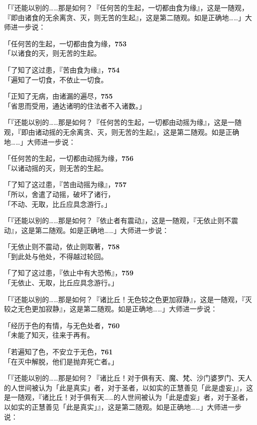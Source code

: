 「『还能以别的……那是如何？『任何苦的生起，一切都由食为缘』，这是一随观，『即由诸食的无余离贪、灭，则无苦的生起』，这是第二随观。如是正确地……」大师进一步说：


「任何苦的生起，一切都由食为缘，\hfill{\grayfootnotesize \textbf{753}} \\
「以诸食的灭，则无苦的生起。

「了知了这过患，『苦由食为缘』，\hfill{\grayfootnotesize \textbf{754}} \\
「遍知了一切食，不依止一切食。

「正知了无病，由诸漏的遍尽，\hfill{\grayfootnotesize \textbf{755}} \\
「省思而受用，通达诸明的住法者不入诸数。」


「『还能以别的……那是如何？『任何苦的生起，一切都由动摇为缘』，这是一随观，『即由诸动摇的无余离贪、灭，则无苦的生起』，这是第二随观。如是正确地……」大师进一步说：


「任何苦的生起，一切都由动摇为缘，\hfill{\grayfootnotesize \textbf{756}} \\
「以诸动摇的灭，则无苦的生起。

「了知了这过患，『苦由动摇为缘』，\hfill{\grayfootnotesize \textbf{757}} \\
「所以，舍遣了动摇，破坏了诸行，\\
「不动、无取，比丘应具念游行。」


「『还能以别的……那是如何？『依止者有震动』，这是一随观，『无依止则不震动』，这是第二随观。如是正确地……」大师进一步说：


「无依止则不震动，依止则取著，\hfill{\grayfootnotesize \textbf{758}} \\
「到此处与他处，不得越过轮回。

「了知了这过患，『依止中有大恐怖』，\hfill{\grayfootnotesize \textbf{759}} \\
「无依止、无取，比丘应具念游行。」

「『还能以别的……那是如何？『诸比丘！无色较之色更加寂静』，这是一随观，『灭较之无色更加寂静』，这是第二随观。如是正确地……」大师进一步说：


「经历于色的有情，与无色处者，\hfill{\grayfootnotesize \textbf{760}} \\
「未能了知灭，往来于再有。

「若遍知了色，不安立于无色，\hfill{\grayfootnotesize \textbf{761}} \\
「在灭中解脱，他们是抛弃死亡者。」


「『还能以别的……那是如何？『诸比丘！对于俱有天、魔、梵、沙门婆罗门、天人的人世间被认为「此是真实」者，对于圣者，以如实的正慧善见「此是虚妄」』，这是一随观，『诸比丘！对于俱有天……的人世间被认为「此是虚妄」者，对于圣者，以如实的正慧善见「此是真实」』，这是第二随观。如是正确地……」大师进一步说：


